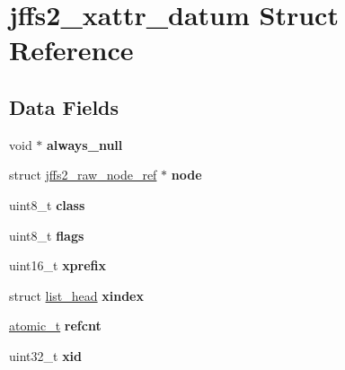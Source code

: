 \hypertarget{structjffs2__xattr__datum}{}\section{jffs2\+\_\+xattr\+\_\+datum Struct Reference}
\label{structjffs2__xattr__datum}
\subsection*{Data Fields}
\begin{DoxyCompactItemize}
\item 
\mbox{\label{structjffs2__xattr__datum_a4032dc83b16bd9d2eb7bdb33f2d67c26}} 
void $\ast$ {\bfseries always\+\_\+null}
\item 
\mbox{\label{structjffs2__xattr__datum_a071178ad486865ba4393eca87bf69174}} 
struct \mbox{\hyperlink{structjffs2__raw__node__ref}{jffs2\+\_\+raw\+\_\+node\+\_\+ref}} $\ast$ {\bfseries node}
\item 
\mbox{\label{structjffs2__xattr__datum_a09055238b25caffb0f9f2ec41ff54510}} 
uint8\+\_\+t {\bfseries class}
\item 
\mbox{\label{structjffs2__xattr__datum_af2d78020dfe5b2cd2582f8d92ac94b42}} 
uint8\+\_\+t {\bfseries flags}
\item 
\mbox{\label{structjffs2__xattr__datum_aefd43817531c74c652821d73aded7dcd}} 
uint16\+\_\+t {\bfseries xprefix}
\item 
\mbox{\label{structjffs2__xattr__datum_aa063dd6784adcdcad5799b0370780f26}} 
struct \mbox{\hyperlink{structlist__head}{list\+\_\+head}} {\bfseries xindex}
\item 
\mbox{\label{structjffs2__xattr__datum_a3a5b82aaf5ceaf69a542e65bc8d9bdaf}} 
\mbox{\hyperlink{structatomic__t}{atomic\+\_\+t}} {\bfseries refcnt}
\item 
\mbox{\label{structjffs2__xattr__datum_aa84a324f9f7debd2ea514e264b74a45d}} 
uint32\+\_\+t {\bfseries xid}
\item 

\end{DoxyCompactItemize}
